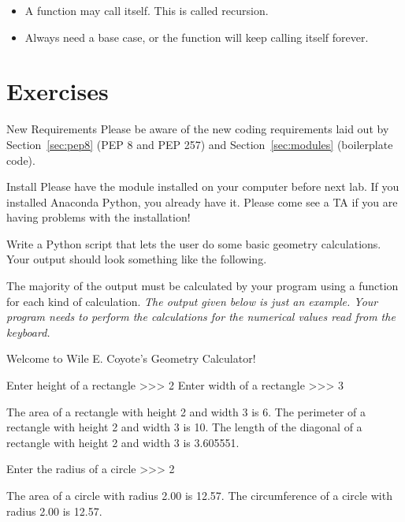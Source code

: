 \documentclass[11pt]{cselabheader}
\begin{document}
{\begin{itemize}
  \item A function may call itself. This is called recursion.
  \item Always need a base case, or the function will keep calling itself
    forever.
\end{itemize}

\pagebreak

\section{Exercises}

\begin{warningbox}{New Requirements}
  Please be aware of the new coding requirements laid out by
  Section~\ref{sec:pep8} (PEP 8 and PEP 257) and Section~\ref{sec:modules}
  (boilerplate code).
\end{warningbox}

\begin{warningbox}{Install}
  Please have the  module installed on your computer
  before next lab. If you installed Anaconda Python, you already have it. Please
  come see a TA if you are having problems with the installation!
\end{warningbox}


\begin{ex}[geometry.py] Write a Python script that lets the user do some basic
  geometry calculations. Your output should look something like the following.

  The majority of the output must be calculated by your program using a function
  for each kind of calculation. \emph{The output given below is just an example.
  Your program needs to perform the calculations for the numerical values read
  from the keyboard.}

  \begin{verbatimcode}
Welcome to Wile E. Coyote's Geometry Calculator!

Enter height of a rectangle >>> 2
Enter width of a rectangle >>> 3

The area of a rectangle with height 2 and width 3 is 6.
The perimeter of a rectangle with height 2 and width 3 is 10.
The length of the diagonal of a rectangle with height 2 and width 3 is 3.605551.

Enter the radius of a circle >>> 2

The area of a circle with radius 2.00 is 12.57.
The circumference of a circle with radius 2.00 is 12.57.


\end{verbatimcode}
\end{ex}}
\end{document}
